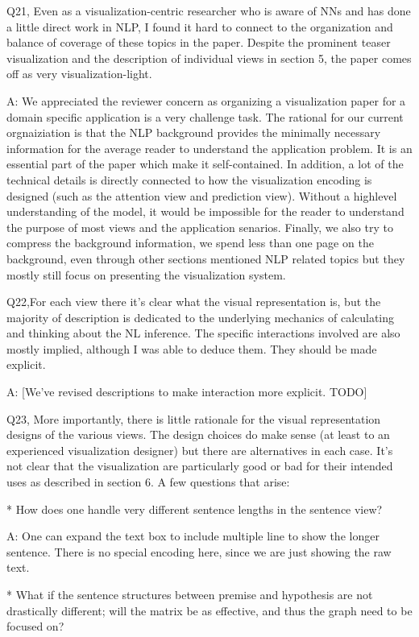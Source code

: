 Q21, Even as a visualization-centric researcher who is aware of NNs and has done a little direct work in NLP, I found it hard to connect to the organization and balance of coverage of these topics in the paper. Despite the prominent teaser visualization and the description of individual views in section 5, the paper comes off as very visualization-light.

A: We appreciated the reviewer concern as organizing a visualization paper for a domain specific application is a very challenge task. The rational for our current orgnaiziation is that the NLP background provides the minimally necessary information for the average reader to understand the application problem. It is an essential part of the paper which make it self-contained. In addition, a lot of the technical details is directly connected to how the visualization encoding is designed (such as the attention view and prediction view). Without a highlevel understanding of the model, it would be impossible for the reader to understand the purpose of most views and the application senarios. Finally, we also try to compress the background information, we spend less than one page on the background, even through other sections mentioned NLP related topics but they mostly still focus on presenting the visualization system.


Q22,For each view there it's clear what the visual representation is, but the majority of description is dedicated to the underlying mechanics of calculating and thinking about the NL inference. The specific interactions involved are also mostly implied, although I was able to deduce them. They should be made explicit.

A: [We've revised descriptions to make interaction more explicit. TODO]


Q23, More importantly, there is little rationale for the visual representation designs of the various views. The design choices do make sense (at least to an experienced visualization designer) but there are alternatives in each case. It's not clear that the visualization are particularly good or bad for their intended uses as described in section 6. A few questions that arise:

* How does one handle very different sentence lengths in the sentence view?

A: One can expand the text box to include multiple line to show the longer sentence. There is no special encoding here, since we are just showing the raw text.

* What if the sentence structures between premise and hypothesis are not drastically different; will the matrix be as effective, and thus the graph need to be focused on?

